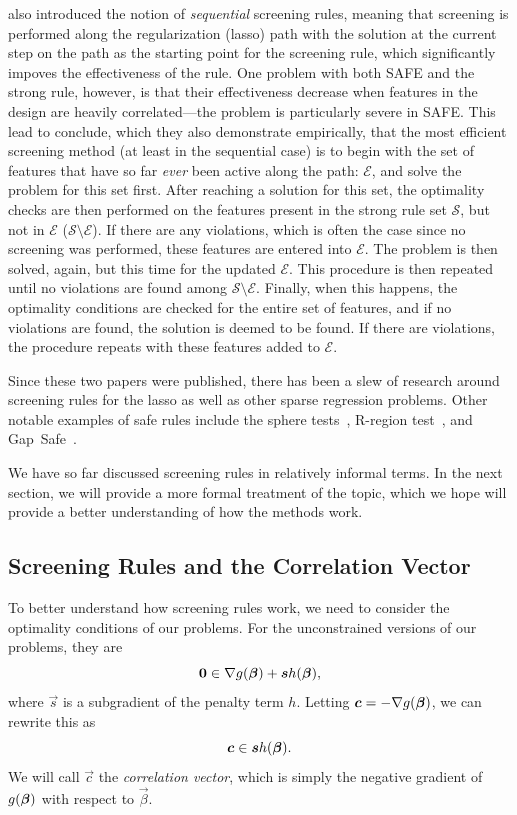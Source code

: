 \textcite{tibshirani2012} also introduced the notion of \emph{sequential} screening rules, meaning that screening is performed along the regularization (lasso) path with the solution at the current step on the path as the starting point for the screening rule, which significantly impoves the effectiveness of the rule. One problem with both SAFE and the strong rule, however, is that their effectiveness decrease when features in the design are heavily correlated---the problem is particularly severe in SAFE. This lead \textcite{tibshirani2012} to conclude, which they also demonstrate empirically, that the most efficient screening method (at least in the sequential case) is to begin with the set of features that have so far \emph{ever} been active along the path: \(\mathcal{E}\), and solve the problem for this set first. After reaching a solution for this set, the optimality checks are then performed on the features present in the strong rule set \(\mathcal{S}\), but not in \(\mathcal{E}\) (\(\mathcal{S} \setminus \mathcal{E}\)). If there are any violations, which is often the case since no screening was performed, these features are entered into \(\mathcal{E}\). The problem is then solved, again, but this time for the updated \(\mathcal{E}\). This procedure is then repeated until no violations are found among \(\mathcal{S} \setminus \mathcal{E}\). Finally, when this happens, the optimality conditions are checked for the entire set of features, and if no violations are found, the solution is deemed to be found. If there are violations, the procedure repeats with these features added to \(\mathcal{E}\).

Since these two papers were published, there has been a slew of research around screening rules for the lasso as well as other sparse regression problems. Other notable examples of safe rules include the sphere tests~\parencite{xiang2011},
R-region test~\parencite{xiang2012}, and
Gap~Safe~\parencite{fercoq2015,ndiaye2017}.

We have so far discussed screening rules in relatively informal terms. In the next section, we will provide a more formal treatment of the topic, which we hope will provide a better understanding of how the methods work.

\subsection{Screening Rules and the Correlation Vector}

To better understand how screening rules work, we need to consider the optimality conditions of our problems. For the unconstrained versions of our problems, they are
\begin{equation*}
  \boldsymbol{0} \in \nabla g(\boldsymbol{\beta}) + \boldsymbol{s} h(\boldsymbol{\beta}),
\end{equation*}
where \(\vec{s}\) is a subgradient of the penalty term \(h\). Letting \(\boldsymbol{c} = -\nabla g(\boldsymbol{\beta})\), we can rewrite this as
\begin{equation}
  \label{eq:kkt-check}
  \boldsymbol{c} \in \boldsymbol{s} h(\boldsymbol{\beta}).
\end{equation}
We will call \(\vec{c}\) the \emph{correlation vector}, which is simply the negative gradient of \(g(\boldsymbol{\beta})\) with respect to \(\vec{\beta}\).

